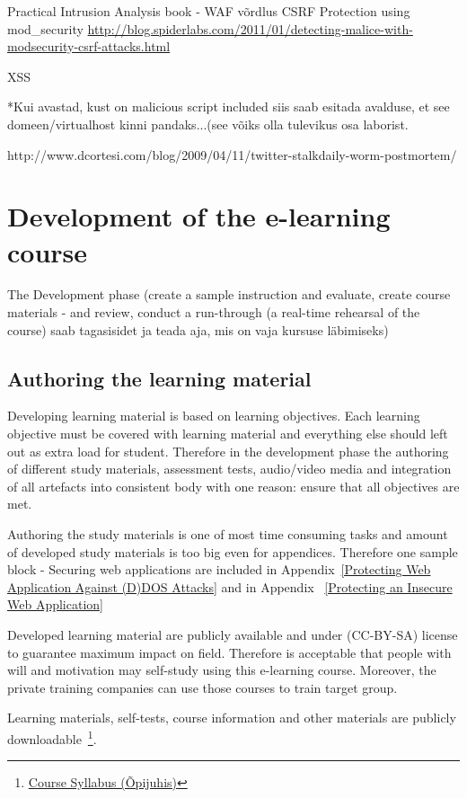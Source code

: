 Practical Intrusion Analysis book - WAF võrdlus \citep{book:practica_intrusion_analysis}
\gls{CSRF}
Protection using mod\_security
\url{http://blog.spiderlabs.com/2011/01/detecting-malice-with-modsecurity-csrf-attacks.html}

\gls{XSS}
{
\color{red} *Kui avastad, kust on malicious script included siis saab esitada avalduse, et see domeen/virtualhost kinni pandaks...(see võiks olla tulevikus osa laborist.

http://www.dcortesi.com/blog/2009/04/11/twitter-stalkdaily-worm-postmortem/
}


\section{Development of the e-learning course}
The Development phase  (create a sample instruction and evaluate, create course materials - and review, conduct a run-through (a real-time rehearsal of the course) saab tagasisidet ja teada aja, mis on vaja kursuse läbimiseks)

\subsection{Authoring the learning material}
Developing learning material is based on learning objectives. Each learning objective must be covered with learning material and everything else should left out as extra load for student. Therefore in the development phase the authoring of different study materials, assessment tests, audio/video media and integration of all artefacts into consistent body with one reason: ensure that all objectives are met.

Authoring the study materials is one of most time consuming tasks and amount of developed study materials is too big even for appendices. Therefore one sample block - Securing web applications are included in Appendix~\ref{Protecting Web Application Against (D)DOS Attacks} and in Appendix~ \ref{Protecting an Insecure Web Application} 

Developed learning material are publicly available and under (\gls{CC-BY-SA}) license to guarantee maximum impact on field. Therefore is acceptable that people with will and motivation may self-study using this e-learning course. Moreover, the private training companies can use those courses to train target group.

Learning materials, self-tests, course information and other materials are publicly downloadable~\footnote{\href{http://elab.itcollege.ee:8000/cyber-course/}{Course Syllabus (Õpijuhis)}}.



